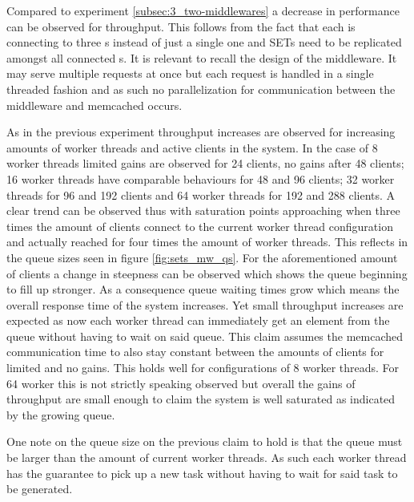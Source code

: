             Compared to experiment \ref{subsec:3_two-middlewares} a decrease in performance can be observed for
            throughput. This follows from the fact that each \mw{} is connecting to three \srv{}s instead of just a
            single one and SETs need to be replicated amongst all connected \srv{}s. It is relevant to recall the design
            of the middleware. It may serve multiple requests at once but each request is handled in a single threaded
            fashion and as such no parallelization for communication between the middleware and memcached occurs.

            As in the previous experiment throughput increases are observed for increasing amounts of worker threads and
            active clients in the system. In the case of 8 worker threads limited gains are observed for 24 clients, no
            gains after 48 clients; 16 worker threads have comparable behaviours for 48 and 96 clients; 32 worker
            threads for 96 and 192 clients and 64 worker threads for 192 and 288 clients. A clear trend can be observed
            thus with saturation points approaching when three times the amount of clients connect to the current
            worker thread configuration and actually reached for four times the amount of worker threads. This reflects
            in the queue sizes seen in figure \ref{fig:sets_mw_qs}. For the aforementioned amount of clients a change in
            steepness can be observed which shows the queue beginning to fill up stronger. As a consequence queue
            waiting times grow which means the overall response time of the system increases. Yet small throughput
            increases are expected as now each worker thread can immediately get an element from the queue without
            having to wait on said queue. This claim assumes the memcached communication time to also stay constant
            between the amounts of clients for limited and no gains. This holds well for configurations of 8 worker threads. For 64 worker this is not strictly speaking observed but overall the gains of throughput
            are small enough to claim the system is well saturated as indicated by the growing queue.

            One note on the queue size on the previous claim to hold is that the queue must be larger than the amount of
            current worker threads. As such each worker thread has the guarantee to pick up a new task without having
            to wait for said task to be generated.

